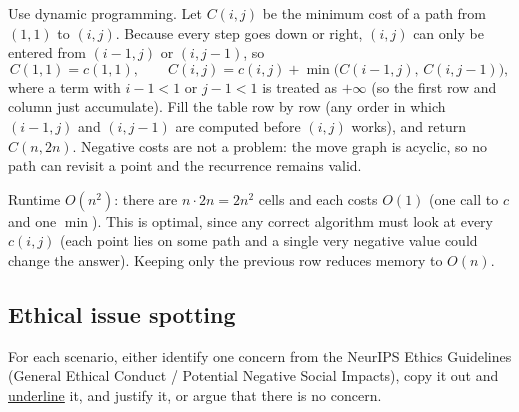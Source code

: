 \begin{solution}
Use dynamic programming. Let $C(i,j)$ be the minimum cost of a path from $(1,1)$ to $(i,j)$. Because every
step goes down or right, $(i,j)$ can only be entered from $(i-1,j)$ or $(i,j-1)$, so
\[
C(1,1)=c(1,1),\qquad
C(i,j)=c(i,j)+\min\bigl(C(i-1,j),\,C(i,j-1)\bigr),
\]
where a term with $i-1<1$ or $j-1<1$ is treated as $+\infty$ (so the first row and column just accumulate).
Fill the table row by row (any order in which $(i-1,j)$ and $(i,j-1)$ are computed before $(i,j)$ works), and
return $C(n,2n)$. Negative costs are not a problem: the move graph is acyclic, so no path can revisit a point
and the recurrence remains valid.

Runtime $O(n^2)$: there are $n\cdot 2n=2n^2$ cells and each costs $O(1)$ (one call to $c$ and one $\min$).
This is optimal, since any correct algorithm must look at every $c(i,j)$ (each point lies on some path and a
single very negative value could change the answer). Keeping only the previous row reduces memory to $O(n)$.
\end{solution}

\subsection{Ethical issue spotting}

For each scenario, either identify one concern from the NeurIPS Ethics Guidelines (General Ethical Conduct /
Potential Negative Social Impacts), copy it out and \uline{underline} it, and justify it, or argue that
there is no concern.


